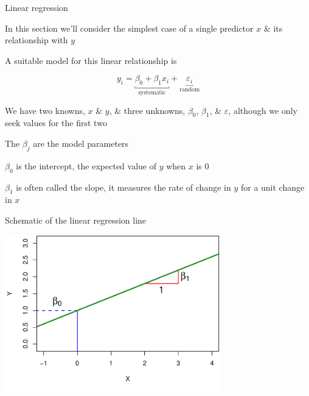 \documentclass[10pt,ignorenonframetext,compress, aspectratio=169]{beamer}
\begin{document}
\begin{frame}{Linear regression}

In this section we'll consider the simplest case of a single predictor
\(x\) \& its relationship with \(y\)

A suitable model for this linear relationship is

\[y_i = \underbracket{\beta_0 + \beta_1x_i}_\text{systematic} + \underbracket{\varepsilon_i}_\text{random}\]

We have two knowns, \(x\) \& \(y\), \& three unknowns, \(\beta_0\),
\(\beta_1\), \& \(\varepsilon\), although we only seek values for the
first two

The \(\beta_j\) are the model \alert{parameters}

\(\beta_0\) is the intercept, the expected value of \(y\) when \(x\) is
0

\(\beta_1\) is often called the slope, it measures the rate of change in
\(y\) for a unit change in \(x\)

\end{frame}

\begin{frame}{Schematic of the linear regression line}

\begin{center}\includegraphics[width=0.7\textwidth]{03-linear-models_files/figure-beamer/linear-regression-schematic-1} \end{center}

\end{frame}
\end{document}
